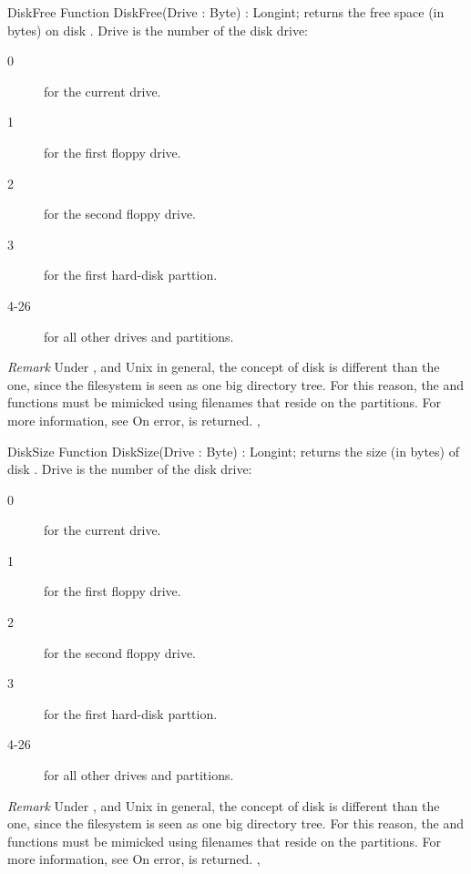 \begin{function}{DiskFree}
\Declaration
Function DiskFree(Drive : Byte) : Longint;
\Description
{} returns the free space (in bytes) on disk .
Drive is the number of the disk drive: 
\begin{description}
\item[0] for the current drive.
\item[1] for the first floppy drive.
\item[2] for the second floppy drive.
\item[3] for the first hard-disk parttion.
\item[4-26] for all other drives and partitions.
\end{description}

{\em Remark} Under \linux, and Unix in general, the concept of disk is
different than the \dos one, since the filesystem is seen as one big
directory tree. For this reason, the  and 
functions must be mimicked using filenames that reside on the partitions.
For more information, see 
\Errors
On error,  is returned.
\SeeAlso
{}, 
\end{function}

\html{}
 
\begin{function}{DiskSize}
\Declaration
Function DiskSize(Drive : Byte) : Longint;
\Description
{} returns the size (in bytes) of disk .
Drive is the number of the disk drive: 
\begin{description}
\item[0] for the current drive.
\item[1] for the first floppy drive.
\item[2] for the second floppy drive.
\item[3] for the first hard-disk parttion.
\item[4-26] for all other drives and partitions.
\end{description}

{\em Remark} Under \linux, and Unix in general, the concept of disk is
different than the \dos one, since the filesystem is seen as one big
directory tree. For this reason, the  and 
functions must be mimicked using filenames that reside on the partitions.
For more information, see 
\Errors
On error,  is returned.
\SeeAlso
{}, 
\end{function}


